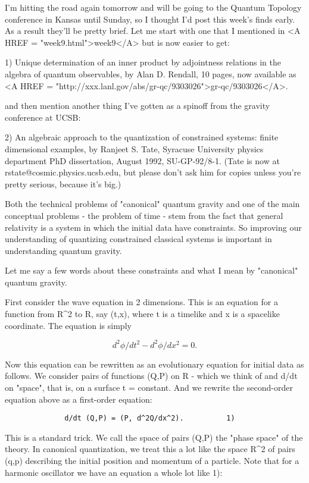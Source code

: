 

I'm hitting the road again tomorrow and will be going to the Quantum
Topology conference in Kansas until Sunday, so I thought I'd post this
week's finds early.  As a result they'll be pretty brief.  Let me start
with one that I mentioned in <A HREF = "week9.html">week9</A> but is now easier to get:

1)  Unique determination of an inner product by adjointness relations
in the algebra of quantum observables, by Alan D. Rendall, 10 pages, now
available as <A HREF = "http://xxx.lanl.gov/abs/gr-qc/9303026">gr-qc/9303026</A>.

and then mention another thing I've gotten as a spinoff from the
gravity conference at UCSB:

2)  An algebraic approach to the quantization of constrained systems:
finite dimensional examples, by Ranjeet S. Tate, Syracuse University
physics department PhD dissertation, August 1992, SU-GP-92/8-1.  (Tate
is now at rstate@cosmic.physics.ucsb.edu, but please don't ask him for
copies unless you're pretty serious, because it's big.)

Both the technical problems of "canonical" quantum gravity and one of the
main conceptual problems - the problem of time - stem from the fact that
general relativity is a system in which the initial data have
constraints.  So improving our understanding of quantizing constrained
classical systems is important in understanding quantum gravity.

Let me say a few words about these constraints and what I mean by
"canonical" quantum gravity.  

First consider the wave equation in 2 dimensions.  This is
an equation for a function from R^2 to R, say \phi (t,x), where t is a
timelike and x is a spacelike coordinate.  The equation is simply

$$
		d^2 \phi /dt^2 - d^2\phi /dx^2 = 0.
$$
    
Now this equation can be rewritten as an evolutionary equation for
initial data as follows.  We consider pairs of functions (Q,P) on R -
which we think of \phi  and d\phi /dt on "space", that is, on a surface t =
constant.  And we rewrite the second-order equation above as a
first-order equation:

\begin{verbatim}
              d/dt (Q,P) = (P, d^2Q/dx^2).			1)
\end{verbatim}
    
This is a standard trick.  We call the space of pairs (Q,P) the "phase
space" of the theory.  In canonical quantization, we treat this a lot
like the space R^2 of pairs (q,p) describing the initial position and
momentum of a particle.  Note that for a harmonic oscillator we have an
equation a whole lot like 1):

